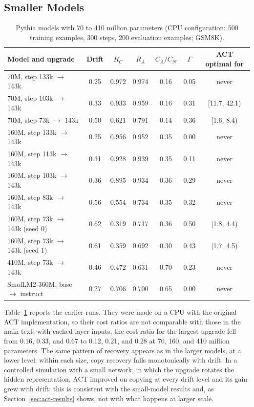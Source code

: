 \documentclass[ijds,blindrev]{informs4}
\begin{document}
\begin{APPENDICES}
\section{Smaller Models}\label{app:small}

\begin{table}[t]
\centering
\caption{Pythia models with 70 to 410 million parameters (CPU configuration: 500 training examples, 300 steps, 200 evaluation examples; GSM8K).}\label{tab:small}
\small
\begin{tabular}{lcccccc}
\toprule
Model and upgrade & Drift & $R_C$ & $R_A$ & $C_A/C_N$ & $\Gamma$ & ACT optimal for\\
\midrule
70M, step 133k $\to$ 143k & 0.25 & 0.972 & 0.974 & 0.16 & 0.05 & never\\
70M, step 103k $\to$ 143k & 0.33 & 0.933 & 0.959 & 0.16 & 0.31 & [11.7, 42.1)\\
70M, step 73k $\to$ 143k & 0.50 & 0.621 & 0.791 & 0.14 & 0.36 & [1.6, 8.4)\\
160M, step 133k $\to$ 143k & 0.25 & 0.956 & 0.952 & 0.35 & 0.00 & never\\
160M, step 113k $\to$ 143k & 0.31 & 0.928 & 0.939 & 0.35 & 0.11 & never\\
160M, step 103k $\to$ 143k & 0.36 & 0.895 & 0.934 & 0.36 & 0.29 & never\\
160M, step 83k $\to$ 143k & 0.56 & 0.554 & 0.734 & 0.35 & 0.32 & never\\
160M, step 73k $\to$ 143k (seed 0) & 0.62 & 0.319 & 0.717 & 0.36 & 0.50 & [1.8, 4.4)\\
160M, step 73k $\to$ 143k (seed 1) & 0.61 & 0.359 & 0.692 & 0.30 & 0.43 & [1.7, 4.5)\\
410M, step 73k $\to$ 143k & 0.46 & 0.472 & 0.631 & 0.70 & 0.23 & never\\
SmolLM2-360M, base $\to$ instruct & 0.27 & 0.706 & 0.700 & 0.65 & 0.00 & never\\
\bottomrule
\end{tabular}
\end{table}

Table~\ref{tab:small} reports the earlier runs. They were made on a CPU with the original ACT implementation, so their cost ratios are not comparable with those in the main text; with cached layer inputs, the cost ratio for the largest upgrade fell from 0.16, 0.33, and 0.67 to 0.12, 0.21, and 0.28 at 70, 160, and 410 million parameters. The same pattern of recovery appears as in the larger models, at a lower level: within each size, copy recovery falls monotonically with drift. In a controlled simulation with a small network, in which the upgrade rotates the hidden representation, ACT improved on copying at every drift level and its gain grew with drift; this is consistent with the small-model results and, as Section~\ref{sec:act-results} shows, not with what happens at larger scale.

\end{APPENDICES}




\end{document}
